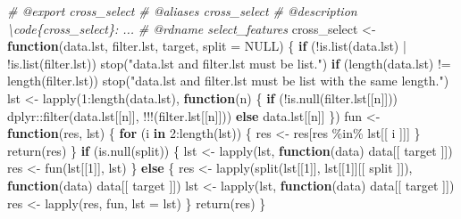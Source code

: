 \documentclass[
]{article}
\newenvironment{Shaded}{\begin{snugshade}}{\end{snugshade}}
\newcommand{\AttributeTok}[1]{\textcolor[rgb]{0.77,0.63,0.00}{#1}}
\newcommand{\CommentTok}[1]{\textcolor[rgb]{0.56,0.35,0.01}{\textit{#1}}}
\newcommand{\ConstantTok}[1]{\textcolor[rgb]{0.00,0.00,0.00}{#1}}
\newcommand{\ControlFlowTok}[1]{\textcolor[rgb]{0.13,0.29,0.53}{\textbf{#1}}}
\newcommand{\DecValTok}[1]{\textcolor[rgb]{0.00,0.00,0.81}{#1}}
\newcommand{\FunctionTok}[1]{\textcolor[rgb]{0.00,0.00,0.00}{#1}}
\newcommand{\NormalTok}[1]{#1}
\newcommand{\OtherTok}[1]{\textcolor[rgb]{0.56,0.35,0.01}{#1}}
\newcommand{\SpecialCharTok}[1]{\textcolor[rgb]{0.00,0.00,0.00}{#1}}
\newcommand{\StringTok}[1]{\textcolor[rgb]{0.31,0.60,0.02}{#1}}
\begin{document}
\begin{Shaded}
\begin{Highlighting}[]
\CommentTok{\#\textquotesingle{} @export cross\_select}
\CommentTok{\#\textquotesingle{} @aliases cross\_select}
\CommentTok{\#\textquotesingle{} @description \textbackslash{}code\{cross\_select\}: ...}
\CommentTok{\#\textquotesingle{} @rdname select\_features}
\NormalTok{cross\_select }\OtherTok{\textless{}{-}} \ControlFlowTok{function}\NormalTok{(data.lst, filter.lst, target, }\AttributeTok{split =} \ConstantTok{NULL}\NormalTok{) \{}
  \ControlFlowTok{if}\NormalTok{ (}\SpecialCharTok{!}\FunctionTok{is.list}\NormalTok{(data.lst) }\SpecialCharTok{|} \SpecialCharTok{!}\FunctionTok{is.list}\NormalTok{(filter.lst))}
    \FunctionTok{stop}\NormalTok{(}\StringTok{"\textasciigrave{}data.lst\textasciigrave{} and \textasciigrave{}filter.lst\textasciigrave{} must be \textquotesingle{}list\textquotesingle{}."}\NormalTok{)}
  \ControlFlowTok{if}\NormalTok{ (}\FunctionTok{length}\NormalTok{(data.lst) }\SpecialCharTok{!=} \FunctionTok{length}\NormalTok{(filter.lst))}
    \FunctionTok{stop}\NormalTok{(}\StringTok{"\textasciigrave{}data.lst\textasciigrave{} and \textasciigrave{}filter.lst\textasciigrave{} must be \textquotesingle{}list\textquotesingle{} with the same length."}\NormalTok{)}
\NormalTok{  lst }\OtherTok{\textless{}{-}} \FunctionTok{lapply}\NormalTok{(}\DecValTok{1}\SpecialCharTok{:}\FunctionTok{length}\NormalTok{(data.lst),}
    \ControlFlowTok{function}\NormalTok{(n) \{}
      \ControlFlowTok{if}\NormalTok{ (}\SpecialCharTok{!}\FunctionTok{is.null}\NormalTok{(filter.lst[[n]]))}
\NormalTok{        dplyr}\SpecialCharTok{::}\FunctionTok{filter}\NormalTok{(data.lst[[n]], }\SpecialCharTok{!!!}\NormalTok{(filter.lst[[n]]))}
      \ControlFlowTok{else}
\NormalTok{        data.lst[[n]]}
\NormalTok{    \})}
\NormalTok{  fun }\OtherTok{\textless{}{-}} \ControlFlowTok{function}\NormalTok{(res, lst) \{}
    \ControlFlowTok{for}\NormalTok{ (i }\ControlFlowTok{in} \DecValTok{2}\SpecialCharTok{:}\FunctionTok{length}\NormalTok{(lst)) \{}
\NormalTok{      res }\OtherTok{\textless{}{-}}\NormalTok{ res[res }\SpecialCharTok{\%in\%}\NormalTok{ lst[[ i ]]]}
\NormalTok{    \}}
    \FunctionTok{return}\NormalTok{(res)}
\NormalTok{  \}}
  \ControlFlowTok{if}\NormalTok{ (}\FunctionTok{is.null}\NormalTok{(split)) \{}
\NormalTok{    lst }\OtherTok{\textless{}{-}} \FunctionTok{lapply}\NormalTok{(lst, }\ControlFlowTok{function}\NormalTok{(data) data[[ target ]])}
\NormalTok{    res }\OtherTok{\textless{}{-}} \FunctionTok{fun}\NormalTok{(lst[[}\DecValTok{1}\NormalTok{]], lst)}
\NormalTok{  \} }\ControlFlowTok{else}\NormalTok{ \{}
\NormalTok{    res }\OtherTok{\textless{}{-}} \FunctionTok{lapply}\NormalTok{(}\FunctionTok{split}\NormalTok{(lst[[}\DecValTok{1}\NormalTok{]], lst[[}\DecValTok{1}\NormalTok{]][[ split ]]),}
      \ControlFlowTok{function}\NormalTok{(data) data[[ target ]])}
\NormalTok{    lst }\OtherTok{\textless{}{-}} \FunctionTok{lapply}\NormalTok{(lst, }\ControlFlowTok{function}\NormalTok{(data) data[[ target ]])}
\NormalTok{    res }\OtherTok{\textless{}{-}} \FunctionTok{lapply}\NormalTok{(res, fun, }\AttributeTok{lst =}\NormalTok{ lst)}
\NormalTok{  \}}
  \FunctionTok{return}\NormalTok{(res)}
\NormalTok{\}}


\end{Highlighting}
\end{Shaded}
\end{document}
